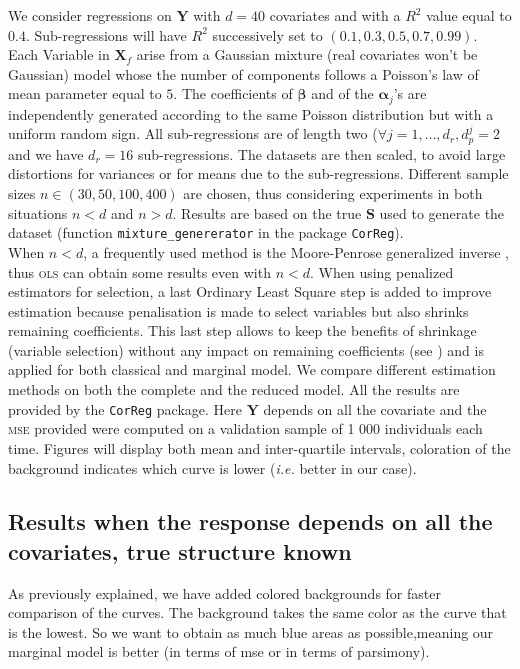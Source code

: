 \documentclass[12pt,a4paper]{report}
\begin{document}
We consider regressions on $\boldsymbol{Y}$ with $d=40$ covariates and with a $R^2$ value equal to $0.4$. Sub-regressions will have $R^2$ successively set to $(0.1,0.3,0.5,0.7,0.99)$. Each Variable in $\boldsymbol{X}_f$ arise from a Gaussian mixture (real covariates won't be Gaussian) model whose the number of components follows a Poisson's law of mean parameter equal to $5$. The coefficients of $\boldsymbol{\beta}$ and of the $\boldsymbol{\alpha}_j$'s are independently generated according to the same Poisson distribution but with a uniform random sign. All sub-regressions are of length two ($\forall j=1,\ldots,d_r, d_p^j=2$ and we have $d_r=16$ sub-regressions. The datasets are then scaled, to avoid large distortions for variances or for means due to the sub-regressions.	Different sample sizes  $n\in (30,50,100,400)$ are chosen, thus considering experiments in both situations $n<d$ and $n>d$. 
	Results are based on the true $\boldsymbol{S}$ used to generate the dataset (function {\tt mixture\_genererator} in the package {\tt CorReg}).\\
	
	When $n<d$, a frequently used method is the Moore-Penrose \cite{katsikis2008fast} generalized inverse , thus \textsc{ols} can obtain some results even with $n<d$. %
	When using penalized estimators for selection, a last Ordinary Least Square step is added to improve estimation because penalisation is made to select variables but also shrinks remaining coefficients. This last step allows to keep the benefits of shrinkage (variable selection) without any impact on remaining coefficients (see \cite{SAM10088}) and is applied for both classical and marginal model.
	We compare different estimation methods on both the complete and the reduced model. All the results are provided by the {\tt CorReg} package. Here $\boldsymbol{Y}$ depends on all the covariate and the \textsc{mse} provided were computed on a validation sample of 1 000 individuals each time. Figures will display both mean and inter-quartile intervals, coloration of the background indicates which curve is lower ({\it i.e.} better in our case). \\
	\subsection{Results when the response depends on all the covariates, true structure known}	
	As previously explained, we have added colored backgrounds for faster comparison of the curves. The background takes the same color as the curve that is the lowest. So we want to obtain as much blue areas as possible,meaning our marginal model is better (in terms of {\sc mse} or in terms of parsimony).
\end{document}
